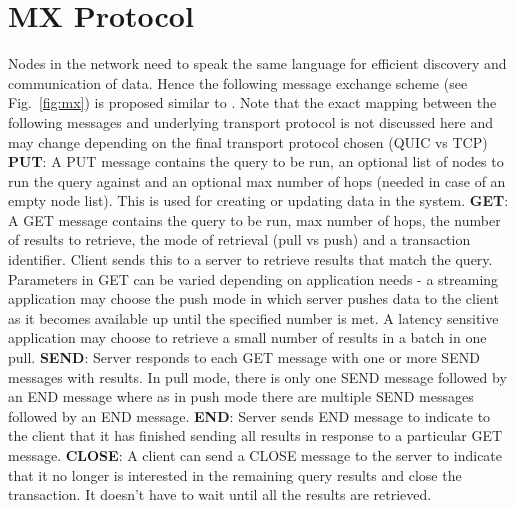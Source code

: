 \documentclass[preprint,10pt]{elsarticle}
\newcommand{\figref}[1]{Fig.~\ref{#1}}
\theoremstyle{definition}
\begin{document}
\section{MX Protocol} \label{sec:mx_protocol}
Nodes in the network need to speak the same language for efficient discovery and communication of data. Hence the following message exchange scheme (see \figref{fig:mx}) is proposed similar to \cite{Protocol_Spec}. Note that the exact mapping between the following messages and underlying transport protocol is not discussed here and may change depending on the final transport protocol chosen (QUIC vs TCP)
\newline
\newline
\textbf{PUT}:  A PUT message contains the query to be run, an optional list of nodes to run the query against and an optional max number of hops (needed in case of an empty node list). This is used for creating or updating data in the system.
\newline
\newline
\textbf{GET}: A GET message contains the query to be run, max number of hops, the number of results to retrieve, the mode of retrieval (pull vs push) and a transaction identifier. Client sends this to a server to retrieve results that match the query. Parameters in GET can be varied depending on application needs - a streaming application may choose the push mode in which server pushes data to the client as it becomes available up until the specified number is met. A latency sensitive application may choose to retrieve a small number of results in a batch in one pull.
\newline
\newline
\textbf{SEND}: Server responds to each GET message with one or more SEND messages with results. In pull mode, there is only one SEND message followed by an END message where as in push mode there are multiple SEND messages followed by an END message.
\newline
\newline
\textbf{END}: Server sends END message to indicate to the client that it has finished sending all results in response to a particular GET message.
\newline
\newline
\textbf{CLOSE}: A client can send a CLOSE message to the server to indicate that it no longer is interested in the remaining query results and close the transaction. It doesn't have to wait until all the results are retrieved.
\newline
\newline
\end{document}

